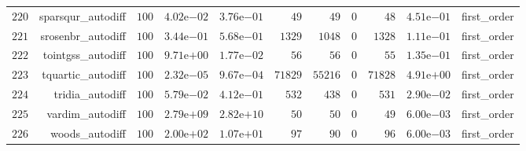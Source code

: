 \documentclass[varwidth=20cm,crop=true]{standalone}
\begin{document}
\begin{longtable}{rrrrrrrrrrr}
  \(   220\) & sparsqur\_autodiff & \(   100\) & \( 4.02\)e\(-02\) & \( 3.76\)e\(-01\) & \(    49\) & \(    49\) & \(     0\) & \(    48\) & \( 4.51\)e\(-01\) & first\_order \\
  \(   221\) & srosenbr\_autodiff & \(   100\) & \( 3.44\)e\(-01\) & \( 5.68\)e\(-01\) & \(  1329\) & \(  1048\) & \(     0\) & \(  1328\) & \( 1.11\)e\(-01\) & first\_order \\
  \(   222\) & tointgss\_autodiff & \(   100\) & \( 9.71\)e\(+00\) & \( 1.77\)e\(-02\) & \(    56\) & \(    56\) & \(     0\) & \(    55\) & \( 1.35\)e\(-01\) & first\_order \\
  \(   223\) & tquartic\_autodiff & \(   100\) & \( 2.32\)e\(-05\) & \( 9.67\)e\(-04\) & \( 71829\) & \( 55216\) & \(     0\) & \( 71828\) & \( 4.91\)e\(+00\) & first\_order \\
  \(   224\) & tridia\_autodiff & \(   100\) & \( 5.79\)e\(-02\) & \( 4.12\)e\(-01\) & \(   532\) & \(   438\) & \(     0\) & \(   531\) & \( 2.90\)e\(-02\) & first\_order \\
  \(   225\) & vardim\_autodiff & \(   100\) & \( 2.79\)e\(+09\) & \( 2.82\)e\(+10\) & \(    50\) & \(    50\) & \(     0\) & \(    49\) & \( 6.00\)e\(-03\) & first\_order \\
  \(   226\) & woods\_autodiff & \(   100\) & \( 2.00\)e\(+02\) & \( 1.07\)e\(+01\) & \(    97\) & \(    90\) & \(     0\) & \(    96\) & \( 6.00\)e\(-03\) & first\_order \\\hline
\end{longtable}
\end{document}
